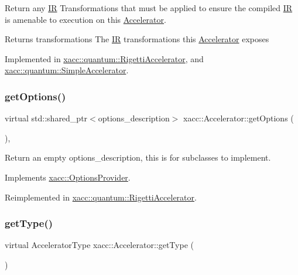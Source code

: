 Return any \hyperlink{a01151}{IR} Transformations that must be applied to ensure the compiled \hyperlink{a01151}{IR} is amenable to execution on this \hyperlink{a01087}{Accelerator}.

\begin{DoxyReturn}{Returns}
transformations The \hyperlink{a01151}{IR} transformations this \hyperlink{a01087}{Accelerator} exposes 
\end{DoxyReturn}


Implemented in \hyperlink{a00919_a443683a1dfb000603c640b2ee303cf66}{xacc\+::quantum\+::\+Rigetti\+Accelerator}, and \hyperlink{a00943_afc49c9e7973ba6c6ff9761c36198323d}{xacc\+::quantum\+::\+Simple\+Accelerator}.

\mbox{\label{a01087_a98c9eda6b54367c75667ecfbbf167979}} 
\subsubsection{\texorpdfstring{get\+Options()}{getOptions()}}
{\footnotesize\ttfamily virtual std\+::shared\+\_\+ptr$<$options\+\_\+description$>$ xacc\+::\+Accelerator\+::get\+Options (\begin{DoxyParamCaption}{ }\end{DoxyParamCaption})\hspace{0.3cm}{\ttfamily [inline]}, {\ttfamily [virtual]}}

Return an empty options\+\_\+description, this is for subclasses to implement. 

Implements \hyperlink{a01195_a6d150954f852109bfe2c1ae90222926f}{xacc\+::\+Options\+Provider}.



Reimplemented in \hyperlink{a00919_a9ee9e62aecbccf193894ca3388676f9f}{xacc\+::quantum\+::\+Rigetti\+Accelerator}.

\mbox{\label{a01087_aaffc3e4bb9880eb5041b1b58ee4c2665}} 
\subsubsection{\texorpdfstring{get\+Type()}{getType()}}
{\footnotesize\ttfamily virtual Accelerator\+Type xacc\+::\+Accelerator\+::get\+Type (\begin{DoxyParamCaption}{ }\end{DoxyParamCaption})\hspace{0.3cm}{\ttfamily [pure virtual]}}

